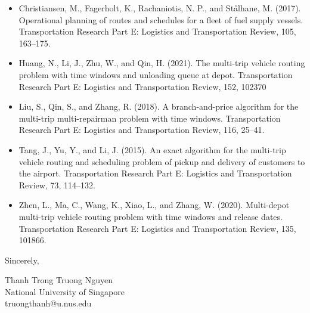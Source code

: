\documentclass[11pt]{letter}
\begin{document}
\begin{itemize}
\item Christiansen, M., Fagerholt, K., Rachaniotis, N. P., and St{\aa}lhane, M. (2017). Operational planning of routes and schedules for a fleet of fuel supply vessels. Transportation Research Part E: Logistics and Transportation Review, 105, 163–175.

\item Huang, N., Li, J., Zhu, W., and Qin, H. (2021). The multi-trip vehicle routing problem with time windows and unloading queue at depot. Transportation Research Part E: Logistics and Transportation Review, 152, 102370

\item Liu, S., Qin, S., and Zhang, R. (2018). A branch-and-price algorithm for the multi-trip multi-repairman problem with time windows. Transportation Research Part E: Logistics and Transportation Review, 116, 25–41.

\item Tang, J., Yu, Y., and Li, J. (2015). An exact algorithm for the multi-trip vehicle routing and scheduling problem of pickup and delivery of customers to the airport. Transportation Research Part E: Logistics and Transportation Review, 73, 114–132.

\item Zhen, L., Ma, C., Wang, K., Xiao, L., and Zhang, W. (2020). Multi-depot multi-trip vehicle routing problem with time windows and release dates. Transportation Research Part E: Logistics and Transportation Review, 135, 101866.

\end{itemize}
\vspace{1cm}

Sincerely,

Thanh Trong Truong Nguyen\\
National University of Singapore\\
truongthanh@u.nus.edu
\end{document}
